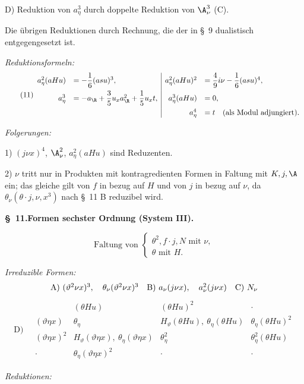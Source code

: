 \noindent D) Reduktion von $a_\eta^3$ durch doppelte Reduktion von $\A_\nu^3$ (C).

Die übrigen Reduktionen durch Rechnung, die der in \S\ 9 dualistisch entgegengesetzt ist.

\noindent\emph{Reduktionsformeln:}
\[
\tag{11}
\begin{array}{rl|rl}
a_\eta^2(aHu)&=-\dfrac16(asu)^3,&
 a_\eta^2(aHu)^2&=\dfrac49 i\nu-\dfrac16(asu)^4,\\[0.7em]
a_\eta^3&=-a_\R+\dfrac35u_xa_\R^2+\dfrac15u_xt,
& a_\eta^3(aHu)&=0,\\[0.7em]
&&a_\eta^4&=t\quad(\text{als Modul adjungiert}).
\end{array}
\]

\noindent\emph{Folgerungen:}

1) $(j\nu x)^4$, $\A_\nu^2$, $a_\eta^2(aHu)$ sind Reduzenten.

2) $\nu$ tritt nur in Produkten mit kontragredienten Formen in Faltung mit $K,j,\A$ ein; das gleiche gilt von $f$ in bezug auf $H$ und von $j$ in bezug auf $\nu$, da $\theta_\nu(\theta\cdot j,\nu,x^3)$ nach \S\ 11 B reduzibel wird.

\begin{center}
\textbf{\S\ 11.\quad Formen sechster Ordnung (System III).}
\end{center}
\[
\text{Faltung von }\left\{\begin{array}{l}
\theta^2,
 f\cdot j,
 N \text{ mit }\nu,\\
\theta\text{ mit }H.
\end{array}\right.
\]

\noindent\emph{Irreduzible Formen:}
\[
\begin{array}{c@{\quad}c@{\quad}c}
\text{A)}\ (\vartheta^2\nu x)^3,\quad \theta_\nu(\vartheta^2\nu x)^3
&
\text{B)}\ a_\nu(j\nu x),\quad a_\nu^2(j\nu x)
&
\text{C)}\ N_\nu
\end{array}
\]
\[
\text{D)}\quad
\begin{array}{c|c|c|c}
 & (\theta Hu)&(\theta Hu)^2&\cdot\\
(\vartheta\eta x)&\theta_\eta&H_\vartheta(\theta Hu),\ \theta_\eta(\theta Hu)&\theta_\eta(\theta Hu)^2\\
(\vartheta\eta x)^2&H_\vartheta(\vartheta\eta x),\ \theta_\eta(\vartheta\eta x)&\theta_\eta^2&\theta_\eta^2(\theta Hu)\\
\cdot&\theta_\eta(\vartheta\eta x)^2&\cdot&\cdot
\end{array}
\]

\noindent\emph{Reduktionen:}

\noindent 